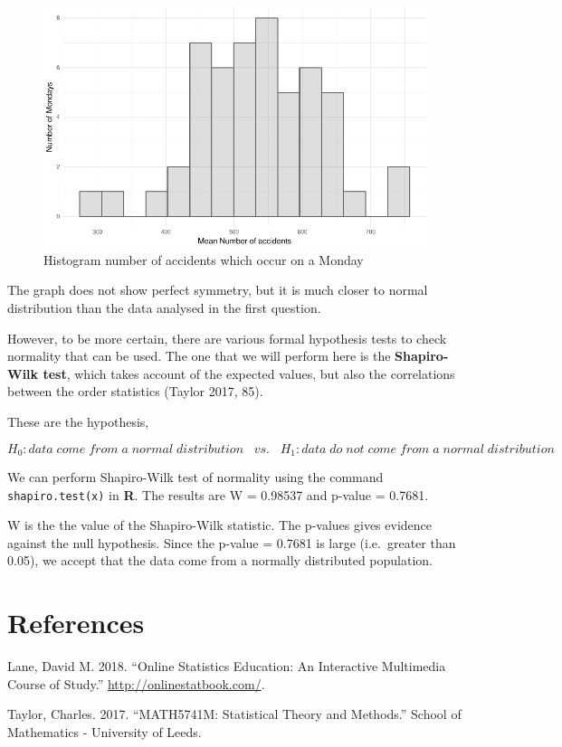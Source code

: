 \documentclass[]{article}
\begin{document}
\begin{figure}[H]

{\centering \includegraphics{READMEv5_files/figure-latex/fig4-1} 

}

\caption{Histogram number of accidents which occur on a Monday}\label{fig:fig4}
\end{figure}

The graph does not show perfect symmetry, but it is much closer to
normal distribution than the data analysed in the first question.

However, to be more certain, there are various formal hypothesis tests
to check normality that can be used. The one that we will perform here
is the \textbf{Shapiro-Wilk test}, which takes account of the expected
values, but also the correlations between the order statistics (Taylor
2017, 85).

These are the hypothesis,

\[H_{0}: data\;come\;from\;a\;normal\;distribution\;\;\;vs.\;\;\;H_{1}:data\;do\;not\;come\;from\;a\;normal\;distribution\]

We can perform Shapiro-Wilk test of normality using the command
\texttt{shapiro.test(x)} in \textbf{R}. The results are W = 0.98537 and
p-value = 0.7681.

W is the the value of the Shapiro-Wilk statistic. The p-values gives
evidence against the null hypothesis. Since the p-value = 0.7681 is
large (i.e.~greater than 0.05), we accept that the data come from a
normally distributed population.

\section*{References}\label{references}

\hypertarget{refs}{}
\hypertarget{ref-lane_online_2018}{}
Lane, David M. 2018. ``Online Statistics Education: An Interactive
Multimedia Course of Study.'' \url{http://onlinestatbook.com/}.

\hypertarget{ref-taylor_math5741m:_2017}{}
Taylor, Charles. 2017. ``MATH5741M: Statistical Theory and Methods.''
School of Mathematics - University of Leeds.
\end{document}
